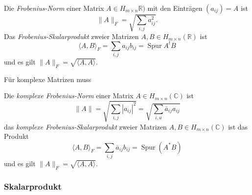 \begin{definition}
Die {\em Frobenius-Norm} einer Matrix $A\in H_{m\times n}\mathbb{R})$
mit den Einträgen $(a_{ij})=A$ ist
\[
\| A\|_F
=
\sqrt{
\sum_{i,j} a_{ij}^2
}.
\]
Das {\em Frobenius-Skalarprodukt} zweier Matrizen
$A,B\in H_{m\times n}(\mathbb{R})$
ist
\[
\langle A,B\rangle_F
=
\sum_{i,j} a_{ij} b_{ij}
=
\operatorname{Spur} A^t B
\]
und es gilt $\|A\|_F = \sqrt{\langle A,A\rangle}$.
\end{definition}

Für komplexe Matrizen muss 

\begin{definition}
Die {\em komplexe Frobenius-Norm} einer Matrix $A\in H_{m\times n}(\mathbb{C})$
ist
\[
\| A\|
=
\sqrt{
\sum_{i,j} |a_{ij}|^2
}
=
\sqrt{
\sum_{i,u} \overline{a}_{ij} a_{ij}
}
\]
das {\em komplexe Frobenius-Skalarprodukt} zweier Matrizen
$A,B\in H_{m\times n}(\mathbb{C})$ ist das Produkt
\[
\langle A,B\rangle_F
=
\sum_{i,j}\overline{a}_{ij} b_{ij}
=
\operatorname{Spur} (A^* B)
\]
und es gilt $\|A\|_F = \sqrt{\langle A,A\rangle}$.
\end{definition}


\subsubsection{Skalarprodukt}




